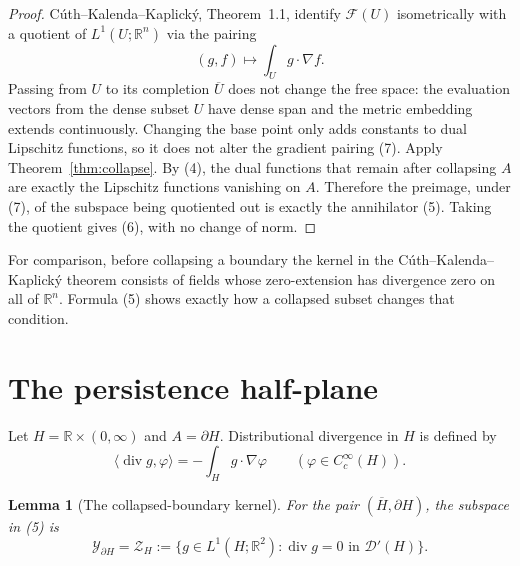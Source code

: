 \documentclass[11pt]{article}
\newtheorem{lemma}[theorem]{Lemma}
\newcommand{\F}{\mathcal F}
\newcommand{\R}{\mathbb R}
\newcommand{\D}{\mathcal D}
\newcommand{\diver}{\operatorname{div}}
\begin{document}
\begin{proof}
C\'uth--Kalenda--Kaplick\'y, Theorem~1.1, identify $\F(U)$ isometrically
with a quotient of $L^1(U;\R^n)$ via the pairing
\[
 (g,f)\longmapsto\int_U g\cdot\nabla f.                        \tag{7}
\]
Passing from $U$ to its completion $\overline U$ does not change the free
space: the evaluation vectors from the dense subset $U$ have dense span and
the metric embedding extends continuously.  Changing the base point only
adds constants to dual Lipschitz functions, so it does not alter the gradient
pairing (7).  Apply
Theorem~\ref{thm:collapse}.  By (4), the dual functions that remain after
collapsing $A$ are exactly the Lipschitz functions vanishing on $A$.
Therefore the preimage, under (7), of the subspace being quotiented out is
exactly the annihilator (5).  Taking the quotient gives (6), with no change
of norm.
\end{proof}

For comparison, before collapsing a boundary the kernel in the
C\'uth--Kalenda--Kaplick\'y theorem consists of fields whose zero-extension
has divergence zero on all of $\R^n$.  Formula (5) shows exactly how a
collapsed subset changes that condition.

\section*{The persistence half-plane}

Let $H=\R\times(0,\infty)$ and $A=\partial H$.  Distributional divergence
in $H$ is defined by
\[
 \langle\diver g,\varphi\rangle=-\int_H g\cdot\nabla\varphi
 \qquad(\varphi\in C_c^\infty(H)).
\]

\begin{lemma}[The collapsed-boundary kernel]\label{lem:boundary}
For the pair $(\overline H,\partial H)$, the subspace in (5) is
\[
 \mathcal Y_{\partial H}
 =\mathcal Z_H
 :=\{g\in L^1(H;\R^2):\diver g=0\text{ in }\D'(H)\}.           \tag{8}
\]
\end{lemma}
\end{document}
